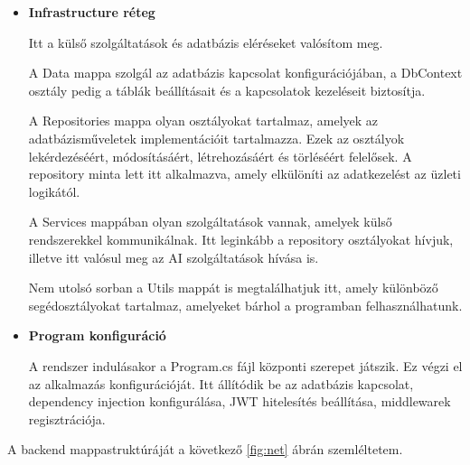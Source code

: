 \begin{itemize}
    Ez az a réteg, amely a rendszer legbelső része. Itt vannak az alkalmazás alapvető elemei, domain logikái.

    Az Entities mappa az adatbázis entitásait tárolja, ezek az üzleti objektumok. Ezeknek segítségével és az Entity Framework segítségével jöttek létre code first módon az adatbázis táblái.

    Az Enums mappában tároljuk a felsorolásokat, ennek segítségével egységes kezelési módot alakítunk ki a különböző állapotok és kategóriák között.

    Az Interfaces mappa egy nagyon fontos hely, mivel ezek határozzák meg a szolgáltatások működését. A dependency injection ennek segítségével valósul meg, amely lehetővé teszi azt implementációk egyszerű cseréjét és a rendszer jobb tesztelhetőségét. \cite{dotnetDI}

    \item \textbf{Infrastructure réteg}

    Itt a külső szolgáltatások és adatbázis eléréseket valósítom meg.

    A Data mappa szolgál az adatbázis kapcsolat konfigurációjában, a DbContext osztály pedig a táblák beállításait és a kapcsolatok kezeléseit biztosítja.

    A Repositories mappa olyan osztályokat tartalmaz, amelyek az adatbázisműveletek implementációit tartalmazza. Ezek az osztályok lekérdezéséért, módosításáért, létrehozásáért és törléséért felelősek. A repository minta lett itt alkalmazva, amely elkülöníti az adatkezelést az üzleti logikától.

    A Services mappában olyan szolgáltatások vannak, amelyek külső rendszerekkel kommunikálnak. Itt leginkább a repository osztályokat hívjuk, illetve itt valósul meg az AI szolgáltatások hívása is.

    Nem utolsó sorban a Utils mappát is megtalálhatjuk itt, amely különböző segédosztályokat tartalmaz, amelyeket bárhol a programban felhasználhatunk.

    \item \textbf{Program konfiguráció}

    A rendszer indulásakor a Program.cs fájl központi szerepet játszik. Ez végzi el az alkalmazás konfigurációját. Itt állítódik be az adatbázis kapcsolat, dependency injection konfigurálása, JWT hitelesítés beállítása, middlewarek regisztrációja. \cite{jwt}
\end{itemize}

A backend mappastruktúráját a következő \ref{fig:net} ábrán szemléltetem.

